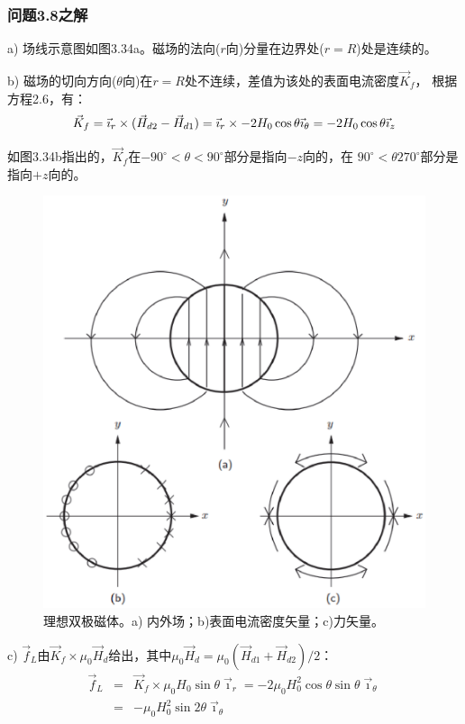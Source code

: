 \subsubsection{问题3.8之解}
a) 场线示意图如图3.34a。磁场的法向($r$向)分量在边界处($r=R$)处是连续的。

b) 磁场的切向方向($\theta$向)在$r=R$处不连续，差值为该处的表面电流密度$\vec{K}_f$，
根据方程2.6，有：
\begin{equation}
\vec{K}_{f}=\vec{\imath}_{r}\times(\vec{H}_{d2}-\vec{H}_{d1})=\vec{\imath}_{r}\times-2H_{0}\cos\theta\vec{\imath}_{\theta}\\
=-2H_{0}\cos\theta\vec{\imath}_{z}\\%
\end{equation}

如图3.34b指出的，$\vec{K}_f$在$-90^\circ<\theta<90^\circ$部分是指向$-z$向的，在
$90^\circ<\theta270^\circ$部分是指向$+z$向的。
\begin{figure}[htbp]
	\centering
	\includegraphics[scale=0.5]{chpt3/figs/fig3.34.eps}
	\caption{理想双极磁体。a) 内外场；b)表面电流密度矢量；c)力矢量。}
\end{figure}

c) $\vec{f}_L$由$\vec{K}_f\times\mu_0 \vec{H}_d$给出，其中$\mu_0 \vec{H}_d=\mu_0(\vec{H}_{d1}+\vec{H}_{d2})/2$：
\begin{eqnarray}
\vec{f}_{L}&=&\vec{K}_{f}\times\mu_{0}H_{0}\sin\theta\vec{\imath}_{r}%
=-2\mu_{0}H_{0}^{2}\cos\theta \sin\theta\vec{\imath}_{\theta}\\
&=&-\mu_{0}H_{0}^{2}\sin 2\theta\vec{\imath}_{\theta}%
\end{eqnarray}

